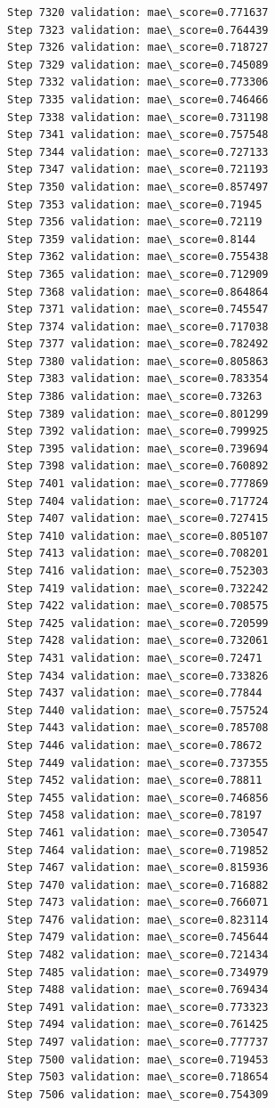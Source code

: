 \documentclass[11pt]{article}
\begin{document}
\begin{Verbatim}[commandchars=\\\{\}]
Step 7320 validation: mae\_score=0.771637
Step 7323 validation: mae\_score=0.764439
Step 7326 validation: mae\_score=0.718727
Step 7329 validation: mae\_score=0.745089
Step 7332 validation: mae\_score=0.773306
Step 7335 validation: mae\_score=0.746466
Step 7338 validation: mae\_score=0.731198
Step 7341 validation: mae\_score=0.757548
Step 7344 validation: mae\_score=0.727133
Step 7347 validation: mae\_score=0.721193
Step 7350 validation: mae\_score=0.857497
Step 7353 validation: mae\_score=0.71945
Step 7356 validation: mae\_score=0.72119
Step 7359 validation: mae\_score=0.8144
Step 7362 validation: mae\_score=0.755438
Step 7365 validation: mae\_score=0.712909
Step 7368 validation: mae\_score=0.864864
Step 7371 validation: mae\_score=0.745547
Step 7374 validation: mae\_score=0.717038
Step 7377 validation: mae\_score=0.782492
Step 7380 validation: mae\_score=0.805863
Step 7383 validation: mae\_score=0.783354
Step 7386 validation: mae\_score=0.73263
Step 7389 validation: mae\_score=0.801299
Step 7392 validation: mae\_score=0.799925
Step 7395 validation: mae\_score=0.739694
Step 7398 validation: mae\_score=0.760892
Step 7401 validation: mae\_score=0.777869
Step 7404 validation: mae\_score=0.717724
Step 7407 validation: mae\_score=0.727415
Step 7410 validation: mae\_score=0.805107
Step 7413 validation: mae\_score=0.708201
Step 7416 validation: mae\_score=0.752303
Step 7419 validation: mae\_score=0.732242
Step 7422 validation: mae\_score=0.708575
Step 7425 validation: mae\_score=0.720599
Step 7428 validation: mae\_score=0.732061
Step 7431 validation: mae\_score=0.72471
Step 7434 validation: mae\_score=0.733826
Step 7437 validation: mae\_score=0.77844
Step 7440 validation: mae\_score=0.757524
Step 7443 validation: mae\_score=0.785708
Step 7446 validation: mae\_score=0.78672
Step 7449 validation: mae\_score=0.737355
Step 7452 validation: mae\_score=0.78811
Step 7455 validation: mae\_score=0.746856
Step 7458 validation: mae\_score=0.78197
Step 7461 validation: mae\_score=0.730547
Step 7464 validation: mae\_score=0.719852
Step 7467 validation: mae\_score=0.815936
Step 7470 validation: mae\_score=0.716882
Step 7473 validation: mae\_score=0.766071
Step 7476 validation: mae\_score=0.823114
Step 7479 validation: mae\_score=0.745644
Step 7482 validation: mae\_score=0.721434
Step 7485 validation: mae\_score=0.734979
Step 7488 validation: mae\_score=0.769434
Step 7491 validation: mae\_score=0.773323
Step 7494 validation: mae\_score=0.761425
Step 7497 validation: mae\_score=0.777737
Step 7500 validation: mae\_score=0.719453
Step 7503 validation: mae\_score=0.718654
Step 7506 validation: mae\_score=0.754309

\end{Verbatim}
\end{document}
